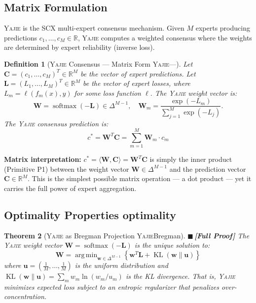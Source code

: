 \documentclass[12pt,a4paper]{article}
\newtheorem{theorem}{Theorem}[section]
\newtheorem{definition}[theorem]{Definition}
\theoremstyle{definition}
\newcommand{\rigorFull}{{\color{rigorcolor}$\blacksquare$\,\textbf{[Full Proof]}}}
\newcommand{\Yajie}{\textsc{Yajie}}
\newcommand{\SCX}{\textsc{SCX}}
\DeclareMathOperator*{\argmin}{arg\,min}
\DeclareMathOperator{\KL}{KL}
\DeclareMathOperator{\softmax}{softmax}
\newcommand{\R}{\mathbb{R}}
\newcommand{\inner}[2]{\langle #1, #2 \rangle}
\newcommand{\mat}[1]{\mathbf{#1}}
\newcommand{\simplex}{\Delta}
\begin{document}
\subsection{Matrix Formulation }

\Yajie{} is the \SCX{} multi-expert consensus mechanism. Given $M$ experts producing 
predictions $c_1, \ldots, c_M \in \R$, \Yajie{} computes a weighted consensus where 
the weights are determined by expert reliability (inverse loss).

\begin{definition}[\Yajie{} Consensus — Matrix Form \Yajie{}---]
\label{def:yajie_matrix}
Let $\mat{C} = (c_1, \ldots, c_M)^T \in \R^M$ be the vector of expert predictions.
Let $\mat{L} = (L_1, \ldots, L_M)^T \in \R^M$ be the vector of expert losses,
where $L_m = \ell(f_m(x), y)$ for some loss function $\ell$. 
The \Yajie{} weight vector is:
\begin{equation}\label{eq:yajie_weights}
    \mat{W} = \softmax(-\mat{L}) \in \simplex^{M-1}, \quad \mat{W}_m = \frac{\exp(-L_m)}{\sum_{j=1}^{M} \exp(-L_j)}.
\end{equation}
The \Yajie{} consensus prediction is:
\begin{equation}\label{eq:yajie_consensus}
    \boxed{c^* = \mat{W}^T \mat{C} = \sum_{m=1}^{M} \mat{W}_m \cdot c_m}
\end{equation}
\end{definition}

\textbf{Matrix interpretation:} $c^* = \inner{\mat{W}}{\mat{C}} = \mat{W}^T \mat{C}$ is 
simply the inner product (Primitive P1) between the weight vector $\mat{W} \in \simplex^{M-1}$ 
and the prediction vector $\mat{C} \in \R^M$. This is the simplest possible matrix 
operation — a dot product — yet it carries the full power of expert aggregation.

\subsection{Optimality Properties optimality}

\begin{theorem}[\Yajie{} as Bregman Projection \Yajie{}Bregman]\label{thm:yajie_bregman}
\rigorFull
The \Yajie{} weight vector $\mat{W} = \softmax(-\mat{L})$ is the unique solution to:
\begin{equation}\label{eq:yajie_optimization}
    \mat{W} = \argmin_{\mat{w} \in \simplex^{M-1}} \left\{\mat{w}^T \mat{L} + \KL(\mat{w} \| \mat{u})\right\}
\end{equation}
where $\mat{u} = (\frac{1}{M}, \ldots, \frac{1}{M})$ is the uniform distribution and 
$\KL(\mat{w}\|\mat{u}) = \sum_m w_m \ln(w_m/u_m)$ is the KL divergence. That is, 
\Yajie{} minimizes expected loss subject to an entropic regularizer that penalizes 
over-concentration.
\end{theorem}
\end{document}
